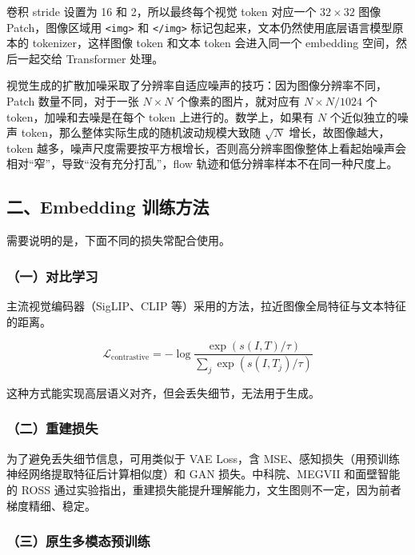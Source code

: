 卷积 stride 设置为 16 和 2，所以最终每个视觉 token 对应一个 \(32\times32\) 图像 Patch，图像区域用 \texttt{\textless{}img\textgreater{}} 和 \texttt{\textless{}/img\textgreater{}} 标记包起来，文本仍然使用底层语言模型原本的 tokenizer，这样图像 token 和文本 token 会进入同一个 embedding 空间，然后一起交给 Transformer 处理。

视觉生成的扩散加噪采取了分辨率自适应噪声的技巧：因为图像分辨率不同，Patch 数量不同，对于一张 \(N\times N\) 个像素的图片，就对应有 \(N\times N/1024\) 个 token，加噪和去噪是在每个 token 上进行的。数学上，如果有 \(N\) 个近似独立的噪声 token，那么整体实际生成的随机波动规模大致随 \(\sqrt{N}\) 增长，故图像越大，token 越多，噪声尺度需要按平方根增长，否则高分辨率图像整体上看起始噪声会相对``窄''，导致``没有充分打乱''，flow 轨迹和低分辨率样本不在同一种尺度上。

\hypertarget{ux4e8cembedding-ux8badux7ec3ux65b9ux6cd5}{%
\subsection{二、Embedding 训练方法}\label{ux4e8cembedding-ux8badux7ec3ux65b9ux6cd5}}

需要说明的是，下面不同的损失常配合使用。

\hypertarget{ux4e00ux5bf9ux6bd4ux5b66ux4e60-1}{%
\subsubsection{（一）对比学习}\label{ux4e00ux5bf9ux6bd4ux5b66ux4e60-1}}

主流视觉编码器（SigLIP、CLIP 等）采用的方法，拉近图像全局特征与文本特征的距离。

\[
\mathcal{L}_{\mathrm{contrastive}}
=-\log\frac{\exp(s(I,T)/\tau)}
{\sum_j\exp(s(I,T_j)/\tau)}
\]

这种方式能实现高层语义对齐，但会丢失细节，无法用于生成。

\hypertarget{ux4e8cux91cdux5efaux635fux5931}{%
\subsubsection{（二）重建损失}\label{ux4e8cux91cdux5efaux635fux5931}}

为了避免丢失细节信息，可用类似于 VAE Loss，含 MSE、感知损失（用预训练神经网络提取特征后计算相似度）和 GAN 损失。中科院、MEGVII 和面壁智能的 ROSS 通过实验指出，重建损失能提升理解能力，文生图则不一定，因为前者梯度精细、稳定。

\hypertarget{ux4e09ux539fux751fux591aux6a21ux6001ux9884ux8badux7ec3}{%
\subsubsection{（三）原生多模态预训练}\label{ux4e09ux539fux751fux591aux6a21ux6001ux9884ux8badux7ec3}}

